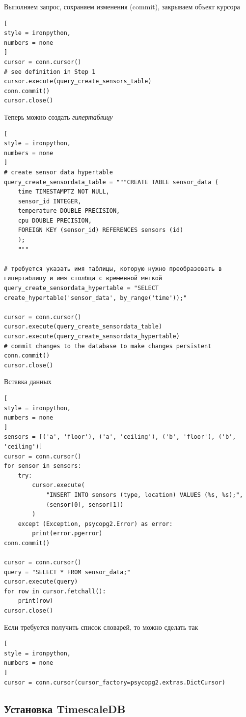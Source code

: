 \documentclass[%
	11pt,
	a4paper,
	utf8,
		]{article}
\begin{document}
Выполняем запрос, сохраняем изменения (commit), закрываем объект курсора
\begin{lstlisting}[
style = ironpython,
numbers = none
]
cursor = conn.cursor()
# see definition in Step 1
cursor.execute(query_create_sensors_table)
conn.commit()
cursor.close()
\end{lstlisting}

Теперь можно создать \emph{гипертаблицу}
\begin{lstlisting}[
style = ironpython,
numbers = none
]
# create sensor data hypertable
query_create_sensordata_table = """CREATE TABLE sensor_data (
	time TIMESTAMPTZ NOT NULL,
	sensor_id INTEGER,
	temperature DOUBLE PRECISION,
	cpu DOUBLE PRECISION,
	FOREIGN KEY (sensor_id) REFERENCES sensors (id)
	);
	"""

# требуется указать имя таблицы, которую нужно преобразовать в гипертаблицу и имя столбца с временной меткой	
query_create_sensordata_hypertable = "SELECT create_hypertable('sensor_data', by_range('time'));"

cursor = conn.cursor()
cursor.execute(query_create_sensordata_table)
cursor.execute(query_create_sensordata_hypertable)
# commit changes to the database to make changes persistent
conn.commit()
cursor.close()
\end{lstlisting}

Вставка данных
\begin{lstlisting}[
style = ironpython,
numbers = none
]
sensors = [('a', 'floor'), ('a', 'ceiling'), ('b', 'floor'), ('b', 'ceiling')]
cursor = conn.cursor()
for sensor in sensors:
	try:
		cursor.execute(
		    "INSERT INTO sensors (type, location) VALUES (%s, %s);",
		    (sensor[0], sensor[1])
		)
	except (Exception, psycopg2.Error) as error:
		print(error.pgerror)
conn.commit()

cursor = conn.cursor()
query = "SELECT * FROM sensor_data;"
cursor.execute(query)
for row in cursor.fetchall():
	print(row)
cursor.close()
\end{lstlisting}

Если требуется получить список словарей, то можно сделать так
\begin{lstlisting}[
style = ironpython,
numbers = none
]
cursor = conn.cursor(cursor_factory=psycopg2.extras.DictCursor)
\end{lstlisting}

\subsection{Установка TimescaleDB}
\end{document}
